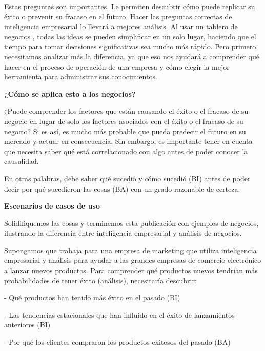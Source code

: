 \documentclass[a4paper,12pt,twocolumn]{article}
\begin{document}
\item 
Estas preguntas son importantes. Le permiten descubrir cómo puede replicar su éxito o prevenir su fracaso en el futuro. Hacer las preguntas  correctas de inteligencia empresarial  lo llevará a mejores análisis. Al usar un tablero de negocios , todas las ideas se pueden simplificar en un solo lugar, haciendo que el tiempo para tomar decisiones significativas sea mucho más rápido. Pero primero, necesitamos analizar más la diferencia, ya que eso nos ayudará a comprender qué hacer en el proceso de operación de una empresa y cómo elegir la mejor herramienta para administrar sus conocimientos.
\item 
\item 
\textbf{¿Cómo se aplica esto a los negocios?}\\
\item 
¿Puede comprender los factores que están  causando  el éxito o el fracaso de su negocio en lugar de solo los factores  asociados  con el éxito o el fracaso de su negocio? Si es así, es mucho más probable que pueda predecir el futuro en su mercado y actuar en consecuencia. Sin embargo, es importante tener en cuenta que necesita saber qué está correlacionado con algo antes de poder conocer la causalidad.
\item
En otras palabras, debe saber  qué  sucedió y  cómo  sucedió (BI) antes de poder decir  por qué  sucedieron las cosas (BA) con un grado razonable de certeza.
\item
\item
\textbf{Escenarios de casos de uso}\\
\item
Solidifiquemos las cosas y terminemos esta publicación con ejemplos de negocios, ilustrando la diferencia entre inteligencia empresarial y análisis de negocios.
\item
Supongamos que trabaja para una empresa de marketing que utiliza inteligencia empresarial y análisis para ayudar a las grandes empresas de comercio electrónico a lanzar nuevos productos. Para comprender qué productos nuevos tendrían más probabilidades de tener éxito (análisis), necesitaría descubrir:
\item 
- Qué productos han tenido más éxito en el pasado (BI)
\item 
- Las tendencias estacionales que han influido en el éxito de lanzamientos anteriores (BI)
\item 
- Por qué los clientes compraron los productos exitosos del pasado (BA)
\textbf{}\\
\end{document}
